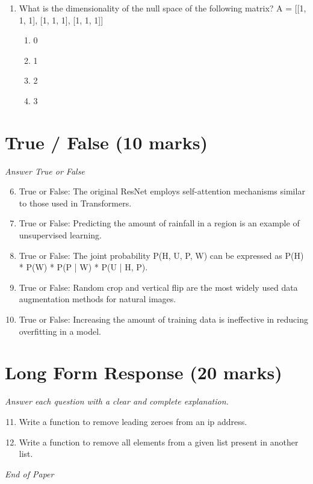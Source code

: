 \documentclass[12pt]{article}
\begin{document}
\begin{enumerate}[label=\arabic*.]
\begin{enumerate}[label=(\alph*)]
    \item 4
    \item 8
    \item 16
\end{enumerate}
\item What is the dimensionality of the null space of the following matrix? A = [[1, 1, 1], [1, 1, 1], [1, 1, 1]]
\begin{enumerate}[label=(\alph*)]
    \item 0
    \item 1
    \item 2
    \item 3
\end{enumerate}
\end{enumerate}

\section*{True / False (10 marks)}
\textit{Answer True or False}
\begin{enumerate}[label=\arabic*.]
\setcounter{enumi}{5}
\item True or False: The original ResNet employs self-attention mechanisms similar to those used in Transformers.
\item True or False: Predicting the amount of rainfall in a region is an example of unsupervised learning.
\item True or False: The joint probability P(H, U, P, W) can be expressed as P(H) * P(W) * P(P | W) * P(U | H, P).
\item True or False: Random crop and vertical flip are the most widely used data augmentation methods for natural images.
\item True or False: Increasing the amount of training data is ineffective in reducing overfitting in a model.
\end{enumerate}

\section*{Long Form Response (20 marks)}
\textit{Answer each question with a clear and complete explanation.}
\begin{enumerate}[label=\arabic*.]
\setcounter{enumi}{10}
\item Write a function to remove leading zeroes from an ip address.
\item Write a function to remove all elements from a given list present in another list.
\end{enumerate}

\vfill
\noindent\textit{End of Paper}
\end{document}
